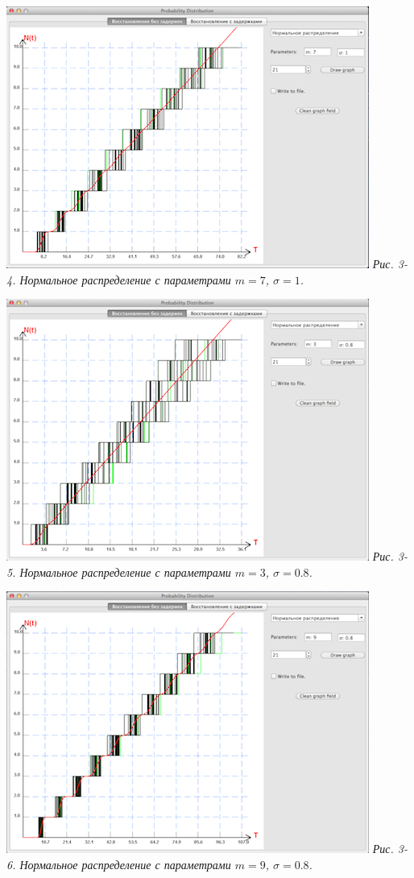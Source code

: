 \includegraphics{3-4.png} 
\textit{Рис. 3-4. Нормальное распределение с параметрами $m = 7$, $\sigma = 1$.}

\includegraphics{3-5.png} 
\textit{Рис. 3-5. Нормальное распределение с параметрами $m = 3$, $\sigma= 0.8$.}

\includegraphics{3-6.png} 
\textit{Рис. 3-6. Нормальное распределение с параметрами $m = 9$, $\sigma = 0.8$.}

